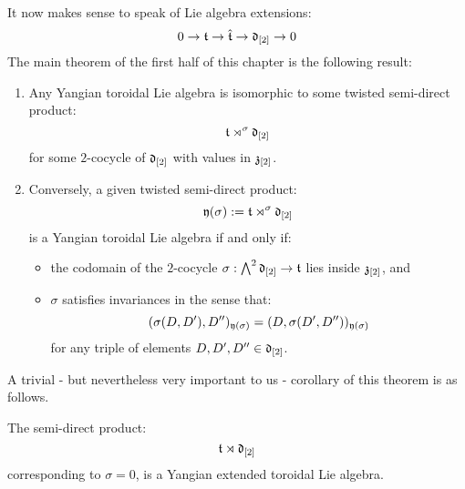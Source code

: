         It now makes sense to speak of Lie algebra extensions:
            $$0 \to \mathfrak{t} \to \hat{\mathfrak{t}} \to \mathfrak{d}_{[2]} \to 0$$
        The main theorem of the first half of this chapter is the following result:
        \begin{theorem} \label{theorem: yangian_extended_toroidal_lie_algebras_preliminary_version}
            \begin{enumerate}
                \item Any Yangian toroidal Lie algebra is isomorphic to some twisted semi-direct product:
                    $$\mathfrak{t} \rtimes^{\sigma} \mathfrak{d}_{[2]}$$
                for some $2$-cocycle of $\mathfrak{d}_{[2]}$ with values in $\mathfrak{z}_{[2]}$.
                \item Conversely, a given twisted semi-direct product:
                    $$\mathfrak{y}(\sigma) := \mathfrak{t} \rtimes^{\sigma} \mathfrak{d}_{[2]}$$
                is a Yangian toroidal Lie algebra if and only if:
                \begin{itemize}
                    \item the codomain of the $2$-cocycle $\sigma: \bigwedge^2 \mathfrak{d}_{[2]} \to \mathfrak{t}$ lies inside $\mathfrak{z}_{[2]}$, and 
                    \item $\sigma$ satisfies invariances in the sense that:
                        $$(\sigma(D, D'), D'')_{\mathfrak{y}(\sigma)} = (D, \sigma(D', D''))_{\mathfrak{y}(\sigma)}$$
                    for any triple of elements $D, D', D'' \in \mathfrak{d}_{[2]}$.
                \end{itemize}
            \end{enumerate}
        \end{theorem}
        A trivial - but nevertheless very important to us - corollary of this theorem is as follows.
        \begin{corollary}
            The semi-direct product:
                $$\mathfrak{t} \rtimes \mathfrak{d}_{[2]}$$
            corresponding to $\sigma = 0$, is a Yangian extended toroidal Lie algebra.
        \end{corollary}

